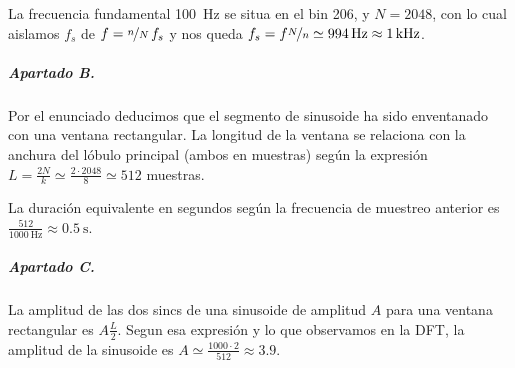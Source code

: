 La frecuencia fundamental \SI{100}{\hertz} se situa en el bin \num{206}, y
$N = 2048$, con lo cual aislamos $f_s$ de $f = \nicefrac{n}{N} \, f_s$ y nos
queda $f_s = f \nicefrac{N}{n} \simeq \SI{994}{\hertz} \approx
\SI{1}{\kilo\hertz}$.

\subparagraph{Apartado B.}

Por el enunciado deducimos que el segmento de sinusoide ha sido enventanado
con una ventana rectangular. La longitud de la ventana se relaciona con la
anchura del lóbulo principal (ambos en muestras) según la expresión
$L = \frac{2N}{k} \simeq \frac{2 \cdot 2048}{8} \simeq 512$ muestras.

La duración equivalente en segundos según la frecuencia de muestreo anterior
es $\frac{512}{\SI{1000}{\hertz}} \approx \SI{0.5}{\second}$.


\subparagraph{Apartado C.}

La amplitud de las dos sincs de una sinusoide de amplitud $A$ para una ventana
rectangular es $A \frac{L}{2}$. Segun esa expresión y lo que observamos en la
DFT, la amplitud de la sinusoide es $A \simeq \frac{1000 \cdot 2}{512} \approx
\num{3.9}$.

\finishpage

